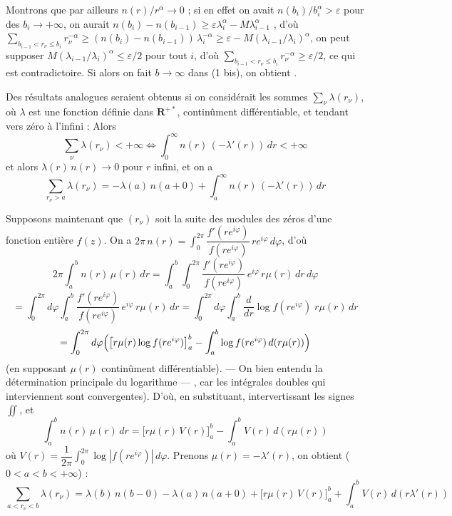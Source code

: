 \documentclass[11pt,a4paper]{article}
\begin{document}
Montrons que par ailleurs $n(r)/r^{\alpha} \to 0$ ; si en effet on avait $n(b_i)/b_i^{\alpha} > \varepsilon$ pour des $b_i \to +\infty$, on aurait $n(b_i) - n(b_{i-1}) \geq \varepsilon \lambda_i^{\alpha} - M \lambda_{i-1}^{\alpha}$ , d'où $\sum_{b_{i-1} < r_\nu \leq b_i} r_\nu^{-\alpha} \geq (n(b_i) - n(b_{i-1}))\,\lambda_i^{-\alpha} \geq \varepsilon - M(\lambda_{i-1}/\lambda_i)^{\alpha}$, on peut supposer $M(\lambda_{i-1}/\lambda_i)^{\alpha} \leq \varepsilon/2$ pour tout $i$, d'où $\sum_{b_{i-1} < r_\nu \leq b_i} r_\nu^{-\alpha} \geq \varepsilon/2$,  ce qui est contradictoire. Si alors on fait $b \to \infty$ dans (1 bis), on obtient . 

\struck{\ill{}} Des résultats analogues seraient obtenus si on considérait les sommes $\sum_\nu \lambda(r_\nu)$, où $\lambda$ est une fonction définie dans $\mathbf{R}^{+*}$, continûment différentiable,  et tendant vers zéro \struck{\ill{}} à l'infini : Alors
\[
  \sum_\nu \lambda(r_\nu) < +\infty \iff \int_0^{\infty} n(r)\,(-\lambda'(r))\,dr < +\infty
\]
 \struck{\ill{}} et alors $\lambda(r)\,n(r) \to 0$ pour $r$ infini, et on a
\[
  \sum_{r_\nu > a} \lambda(r_\nu) = -\lambda(a)\,n(a+0) + \int_a^{\infty} n(r)\,(-\lambda'(r))\,dr
\]

Supposons maintenant que $(r_\nu)$ soit la suite des modules des zéros d'une fonction entière $f(z)$. On a $2\pi\, n(r) = \int_0^{2\pi} \dfrac{f'(re^{i\varphi})}{f(re^{i\varphi})}\, re^{i\varphi}\, d\varphi$, d'où
\[
  2\pi \int_a^b n(r)\,\mu(r)\,dr = \int_a^b \int_0^{2\pi} \frac{f'(re^{i\varphi})}{f(re^{i\varphi})}\, e^{i\varphi}\, r\mu(r)\, dr\, d\varphi
\]
\[
  = \int_0^{2\pi} d\varphi \int_a^b \frac{f'(re^{i\varphi})}{f(re^{i\varphi})}\, e^{i\varphi}\, r\mu(r)\, dr = \int_0^{2\pi} d\varphi \int_a^b \frac{d}{dr}\log f(re^{i\varphi})\; r\mu(r)\, dr
\]
\[
  = \int_0^{2\pi} d\varphi \Bigl( \bigl[ r\mu(r) \log f(re^{i\varphi}) \bigr]_a^b - \int_a^b \log f(re^{i\varphi})\, d(r\mu(r)) \Bigr)
\]
(en supposant $\mu(r)$ continûment différentiable). --- On  bien entendu la détermination principale du logarithme --- , car les intégrales  doubles qui interviennent sont convergentes). D'où, en substituant, intervertissant les signes $\iint$, et  
\[
  \int_a^b n(r)\,\mu(r)\,dr = \bigl[ r\mu(r)\,V(r) \bigr]_a^b - \int_a^b V(r)\, d(r\mu(r))
\]
 où $V(r) = \dfrac{1}{2\pi}\int_0^{2\pi} \log|f(re^{i\varphi})|\,d\varphi$. Prenons $\mu(r) = -\lambda'(r)$, on obtient ($0 < a < b < +\infty$) :
\[
  \sum_{a < r_\nu < b} \lambda(r_\nu) = \lambda(b)\,n(b-0) - \lambda(a)\,n(a+0) + \bigl[ r\mu(r)\,V(r) \bigr]_a^b + \int_a^b V(r)\, d(r\lambda'(r))
\]
\end{document}
